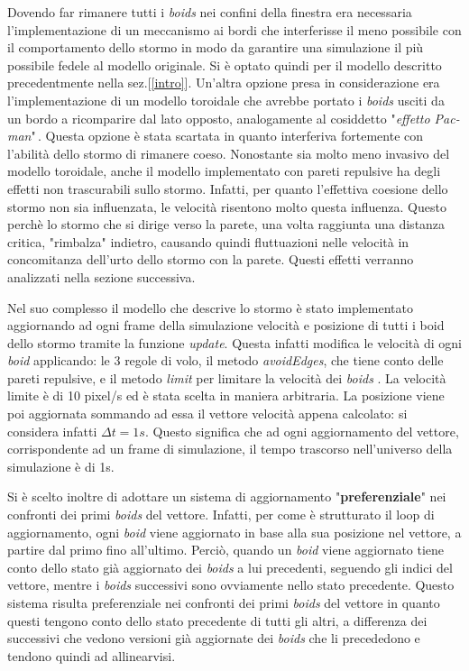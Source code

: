 \documentclass{article}
\begin{document}
Dovendo far rimanere tutti i \textit{boids} nei confini della finestra era 
necessaria l'implementazione di un meccanismo ai bordi che interferisse il meno 
possibile con il comportamento dello stormo in modo da garantire una simulazione
 il più possibile fedele al modello originale. Si è optato quindi per il modello
  descritto precedentmente nella sez.[\ref{intro}]. Un'altra opzione presa in 
  considerazione era l'implementazione di un modello toroidale che avrebbe 
  portato i \textit{boids} usciti da un bordo a ricomparire dal lato opposto, 
  analogamente al cosiddetto "\textit{effetto Pac-man}"\,. Questa opzione è 
  stata scartata in quanto interferiva fortemente con l'abilità dello stormo di 
  rimanere coeso.
Nonostante sia molto meno invasivo del modello toroidale, anche il modello 
implementato con pareti repulsive ha degli effetti non trascurabili sullo 
stormo. Infatti, per quanto l'effettiva coesione dello stormo non sia 
influenzata, le velocità risentono molto questa influenza. Questo perchè lo 
stormo che si dirige verso la parete, una volta raggiunta una distanza critica, 
"rimbalza" indietro, causando quindi fluttuazioni nelle velocità in concomitanza
 dell'urto dello stormo con la parete. Questi effetti verranno analizzati nella 
 sezione successiva.

Nel suo complesso il modello che descrive lo stormo è stato implementato 
aggiornando ad ogni frame della simulazione velocità e posizione di tutti i boid
 dello stormo tramite la funzione \textit{update}. Questa infatti modifica
le velocità di ogni \textit{boid} applicando: le 3 regole di volo, il metodo 
\textit{avoidEdges}, che tiene conto delle pareti repulsive, e il metodo \textit
{limit} per limitare la velocità dei \textit{boids} . La velocità limite è di 
10 pixel/s ed è stata scelta in maniera arbitraria. La posizione viene poi 
aggiornata sommando ad essa il vettore velocità appena calcolato: si considera 
infatti \(\Delta t = 1s\). Questo significa che ad ogni aggiornamento del 
vettore, corrispondente ad un frame di simulazione, il tempo trascorso 
nell'universo della simulazione è di 1s.


Si è scelto inoltre di adottare un sistema di aggiornamento "\textbf
{preferenziale}" nei confronti dei primi \textit{boids} del vettore. Infatti, 
per come è strutturato il loop di aggiornamento, ogni \textit{boid} viene 
aggiornato in base alla sua posizione nel vettore, a partire dal primo fino 
all'ultimo. Perciò, quando un \textit{boid} viene aggiornato tiene conto dello 
stato già aggiornato dei \textit{boids} a lui precedenti, seguendo gli indici 
del vettore, mentre i \textit{boids} successivi sono ovviamente nello stato 
precedente. Questo sistema risulta preferenziale nei confronti dei primi \textit
{boids} del vettore in quanto questi tengono conto dello stato precedente di 
tutti gli altri, a differenza dei successivi che vedono versioni già aggiornate 
dei \textit{boids} che li precededono e tendono quindi ad allinearvisi. 
\end{document}
